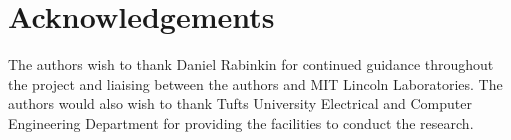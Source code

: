 \section{Acknowledgements}\label{sec:acknowledgements}

The authors wish to thank Daniel Rabinkin for continued guidance throughout the
project and liaising between the authors and MIT Lincoln Laboratories.  The
authors would also wish to thank Tufts University Electrical and Computer
Engineering Department for providing the facilities to conduct the research.
